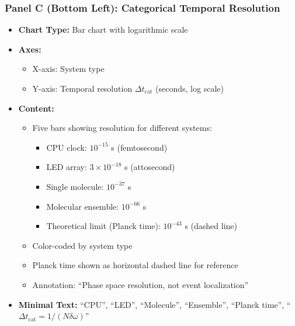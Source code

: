 \subsubsection*{Panel C (Bottom Left): Categorical Temporal Resolution}
\begin{itemize}
\item \textbf{Chart Type:} Bar chart with logarithmic scale
\item \textbf{Axes:}
  \begin{itemize}
  \item X-axis: System type
  \item Y-axis: Temporal resolution $\Delta t_{\text{cat}}$ (seconds, log scale)
  \end{itemize}
\item \textbf{Content:}
  \begin{itemize}
  \item Five bars showing resolution for different systems:
    \begin{itemize}
    \item CPU clock: $10^{-15}$ s (femtosecond)
    \item LED array: $3 \times 10^{-18}$ s (attosecond)
    \item Single molecule: $10^{-37}$ s
    \item Molecular ensemble: $10^{-66}$ s
    \item Theoretical limit (Planck time): $10^{-43}$ s (dashed line)
    \end{itemize}
  \item Color-coded by system type
  \item Planck time shown as horizontal dashed line for reference
  \item Annotation: ``Phase space resolution, not event localization''
  \end{itemize}
\item \textbf{Minimal Text:} ``CPU'', ``LED'', ``Molecule'', ``Ensemble'', ``Planck time'', ``$\Delta t_{\text{cat}} = 1/(N\delta\omega)$''
\end{itemize}

